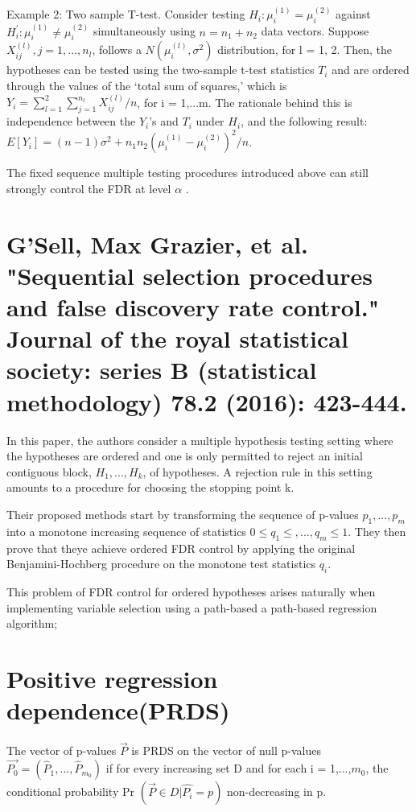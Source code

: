 \documentclass{article}
\begin{document}
Example 2: Two sample T-test. Consider testing $H_i : \mu_i^{(1)} = \mu_i^{(2)}$ against $H^{'}_i : \mu_i^{(1)} \neq \mu_i^{(2)}$ simultaneously using $n = n_1 + n_2$ data vectors. Suppose $X_{ij}^{(l)}, j =1,...,n_l$, follows a $N(\mu_i^{(l)}, \sigma^2)$ distribution, for l = 1, 2. Then, the hypotheses can be tested using
the two-sample t-test statistics $T_i$ and are ordered through the values of the ‘total sum of squares,’ which is $Y_i = \sum_{l=1}^{2} \sum_{j=1}^{n_l} X_{ij}^{(l)}/n$, for i = 1,...m. The rationale behind this is independence between the $Y_i$’s and $T_i$ under $H_i$, and the following result: $E[Y_i] = (n-1)\sigma^2 + n_1n_2(\mu_i^{(1)} - \mu_i^{(2)})^2/n$.

The fixed sequence multiple testing procedures introduced above can still strongly control the FDR at level $\alpha$ .

\section{G'Sell, Max Grazier, et al. "Sequential selection procedures and false discovery rate control." Journal of the royal statistical society: series B (statistical methodology) 78.2 (2016): 423-444.}
In this paper, the authors consider a multiple hypothesis testing setting where the hypotheses are ordered and one is only permitted to reject an initial contiguous block, $H_1,...,H_k$, of hypotheses. A rejection rule in this setting amounts to a procedure for choosing the stopping point k. 

Their proposed methods start by transforming the sequence of p-values $p_1, ..., p_m$ into a monotone increasing sequence of statistics $0 \leq q_1 \leq ,...,q_m \leq 1$. They then prove that theye achieve ordered FDR control by applying the original
Benjamini-Hochberg procedure on the monotone test statistics $q_i$.

This problem of FDR control for ordered hypotheses arises naturally when implementing variable selection using a path-based a path-based regression algorithm;


\cleardoublepage
\appendix
\section{Positive regression dependence(PRDS)}
The vector of p-values $\overrightarrow{P}$ is PRDS on the vector of null p-values $\overrightarrow{P_0} = (\hat{P}_1,...,\hat{P}_{m_0})$ if for every increasing set D and for each i = 1,...,$m_0$, the conditional probability Pr $\left(\overrightarrow{P} \in D | \hat{P_i} = p\right)$ non-decreasing in p.
	
\end{document}
